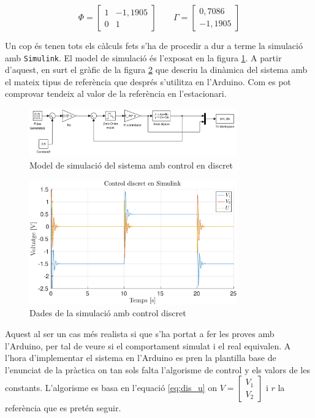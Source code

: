 \documentclass[12pt,a4paper,final,twoside,openright]{report}
\begin{document}
\begin{equation}\label{eq:phi_gam}
\Phi=\begin{bmatrix}
1 &	-1,1905\\
0 & 1
\end{bmatrix} \;\;\;\;\;\;\; \Gamma=\begin{bmatrix}
0,7086\\
-1,1905
\end{bmatrix}
\end{equation}

Un cop és tenen tots els càlculs fets s'ha de procedir a dur a terme la simulació amb \texttt{Simulink}. El model de simulació és l'exposat en la figura \ref{fig:dis_sim_scheme}. A partir d'aquest, en surt el gràfic de la figura \ref{fig:dis_sim} que descriu la dinàmica del sistema amb el mateix tipus de referència que després s'utilitza en l'Arduino. Com es pot comprovar tendeix al valor de la referència en l'estacionari.

\begin{figure}[t]
\centering
\includegraphics[width=0.8\textwidth]{Imatges/dis_sim_scheme.pdf}
\caption{Model de simulació del sistema amb control en discret\label{fig:dis_sim_scheme}}
\end{figure}

\begin{figure}[ht]
\centering
\includegraphics[width=0.8\textwidth]{Imatges/dis_sim.eps}
\caption{Dades de la simulació amb control discret\label{fig:dis_sim}}
\end{figure}

\newpage
Aquest al ser un cas més realista si que s'ha portat a fer les proves amb l'Arduino, per tal de veure si el comportament simulat i el real equivalen. A l'hora d'implementar el sistema en l'Arduino es pren la plantilla base de l'enunciat de la pràctica on tan sols falta l'algorisme de control y els valors de les constants. L'algorisme es basa en l'equació \eqref{eq:dis_u} on $V = \begin{bmatrix}
V_1\\
V_2
\end{bmatrix}$ i $r$ la referència que es pretén seguir.
\end{document}
